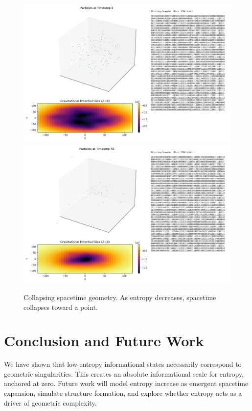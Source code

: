 \documentclass[11pt]{article}
\begin{document}
\begin{figure}[h!]
  \centering
  \includegraphics[width=1.0\textwidth]{figures/collapse_0.png}
  \includegraphics[width=1.0\textwidth]{figures/collapse_40.png}
  \caption{Collapsing spacetime geometry. As entropy decreases, spacetime collapses toward a point.}
  \label{fig:vanishing_entropy}
\end{figure}

\section{Conclusion and Future Work}

We have shown that low-entropy informational states necessarily correspond to geometric singularities. This creates an absolute informational scale for entropy, anchored at zero. Future work will model entropy increase as emergent spacetime expansion, simulate structure formation, and explore whether entropy acts as a driver of geometric complexity.
\end{document}
